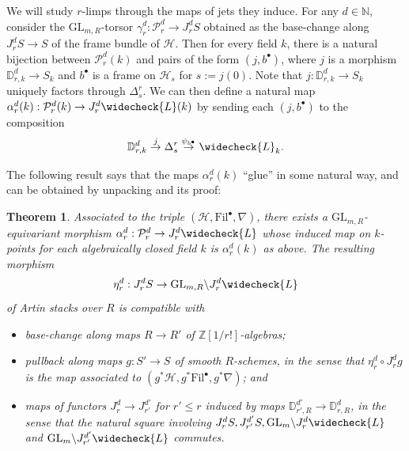 \documentclass[letter, 11pt]{article}
\theoremstyle{plain}
\newtheorem{theorem}[subsubsection]{Theorem}
\theoremstyle{definition}
\newcommand{\ID}{\mathbb{D}}
\newcommand{\IN}{\mathbb{N}}
\newcommand{\IZ}{\mathbb{Z}}
\newcommand{\che}[1]{\widecheck{#1}}
\newcommand{\<}{\langle}
\renewcommand{\>}{\rangle}
\newcommand{\sH}{\mathcal{H}}
\newcommand{\sP}{\mathcal{P}}
\newcommand{\Fil}{\mathrm{Fil}}
\newcommand{\GL}{\mathrm{GL}}
\begin{document}
\subsubsection{} \label{sec: define P^d_r} We will study $r$-limps through the maps of jets they induce. For any $d \in \IN$, consider the $\GL_{m,R}$-torsor $\gamma^d_r : \sP^d_r \to J^d_r S$ obtained as the base-change along $J^d_r S \to S$ of the frame bundle of $\sH$. Then for every field $k$, there is a natural bijection between $\sP^d_r(k)$ and pairs of the form $(j, b^\bullet)$, where $j$ is a morphism $\ID^d_{r, k} \to S_k$ and $b^\bullet$ is a frame on $\sH_{s}$ for $s := j(0)$. Note that $j : \ID^d_{r, k} \to S_k$ uniquely factors through $\Delta^r_s$. We can then define a natural map $\alpha^d_r(k) : \sP^d_r(k) \to J^d_r \che{L} (k)$ by sending each $(j, b^\bullet)$ to the composition  
$$\ID^d_{r, k} \stackrel{j}{\to} \Delta^r_s \stackrel{\psi_{b^\bullet}}{\to} \che{L}_k. $$

The following result says that the maps $\alpha^d_r(k)$ ``glue'' in some natural way, and can be obtained by unpacking \cite[Thm~1.14]{urbanik2022algebraic} and its proof: 

\begin{theorem}
\label{bigjetthm}
Associated to the triple $(\sH, \Fil^\bullet, \nabla)$, there exists a $\GL_{m, R}$-equivariant morphism $\alpha^d_r : \sP^d_r \to J^d_r \che{L}$ whose induced map on $k$-points for each algebraically closed field $k$ is $\alpha^d_r(k)$ as above. The resulting morphism 
\[ \eta^{d}_{r} : J^{d}_{r} S \to \GL_{m, R} \backslash J^{d}_{r} \che{L} \]
of Artin stacks over $R$ is compatible with 
\begin{itemize}
\item[-] base-change along maps $R \to R'$ of $\IZ[1/r!]$-algebras;
\item[-] pullback along maps $g : S' \to S$ of smooth $R$-schemes, in the sense that $\eta^{d}_{r} \circ J^{d}_{r} g$ is the map associated to $(g^{*} \sH, g^{*} \Fil^{\bullet}, g^{*} \nabla)$; and
\item[-] maps of functors $J^{d}_{r} \to J^{d'}_{r'}$ for $r' \leq r$ induced by maps $\mathbb{D}^{d'}_{r',R} \to \mathbb{D}^{d}_{r,R}$, in the sense that the natural square involving $J^{d}_{r} S, J^{d'}_{r'} S, \GL_{m} \backslash J^{d}_{r} \che{L}$ and $\GL_{m} \backslash J^{d'}_{r'} \che{L}$ commutes. 
\end{itemize}
\end{theorem}
\end{document}
